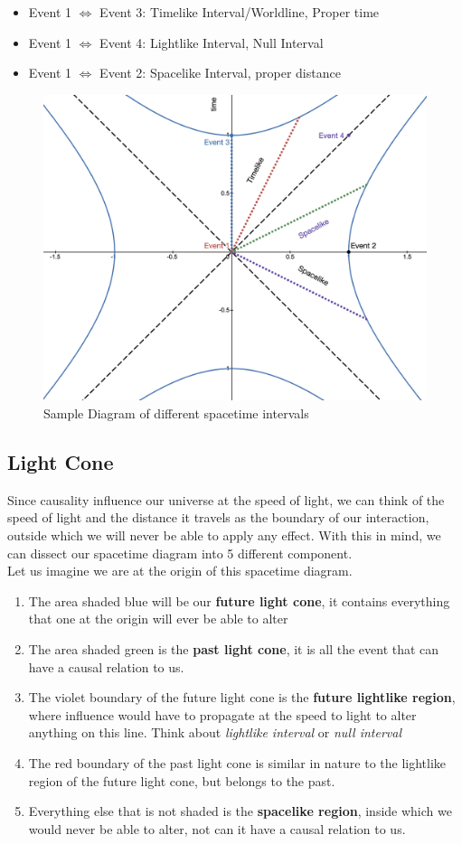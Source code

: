 \documentclass[12pt]{book}
\begin{document}
\begin{itemize}
    \item Event 1 $\iff$ Event 3: Timelike Interval/Worldline, Proper time
    \item Event 1 $\iff$ Event 4: Lightlike Interval, Null Interval
    \item Event 1 $\iff$ Event 2: Spacelike Interval, proper distance 
\end{itemize}

\begin{figure}[!h]
    \centering
    \includegraphics[width=0.5\linewidth]{picture/Spacetime diagram .png}
    \caption{Sample Diagram of different spacetime intervals}
    \label{fig:spacetime diagram}
\end{figure}

\newpage 

\subsection{Light Cone}
Since causality influence our universe at the speed of light, we can think of the speed of light and the distance it travels as the boundary of our interaction, outside which we will never be able to apply any effect. With this in mind, we can dissect our spacetime diagram into 5 different component. \\
\newline
Let us imagine we are at the origin of this spacetime diagram.
\begin{enumerate}
    \item The area shaded blue will be our \textbf{future light cone}, it contains everything that one at the origin will ever be able to alter
    \item The area shaded green is the \textbf{past light cone}, it is all the event that can have a causal relation to us.
    \item The violet boundary of the future light cone is the \textbf{future lightlike region}, where influence would have to propagate at the speed to light to alter anything on this line. Think about \textit{lightlike interval} or \textit{null interval}
    \item The red boundary of the past light cone is similar in nature to the lightlike region of the future light cone, but belongs to the past.
    \item Everything else that is not shaded is the \textbf{spacelike region}, inside which we would never be able to alter, not can it have a causal relation to us. 
\end{enumerate}
\end{document}
